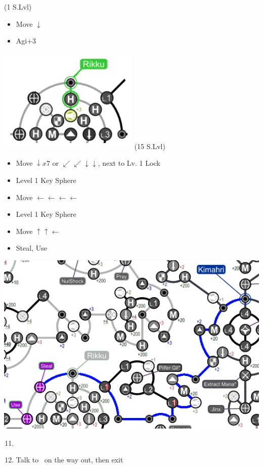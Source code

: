 \begin{spheregrid}
	\begin{multicols}{2}
		\begin{itemize}
			\rikkuf (1 S.Lvl)
			\begin{itemize}
				\item Move $\downarrow$
				\item Agi+3
			\end{itemize}
			\includegraphics[width=.5\columnwidth]{graphics/macalaniarikku}
			\kimahrif (15 S.Lvl)
			\begin{itemize}
				\item Move $\downarrow x7$ or $\swarrow\swarrow\downarrow\downarrow$, next to Lv. 1 Lock
				\item Level 1 Key Sphere
				\item Move $\leftarrow\leftarrow\leftarrow\leftarrow$
				\item Level 1 Key Sphere
				\item Move $\uparrow\uparrow\leftarrow$
				\item Steal, Use
			\end{itemize}
			\includegraphics[width=.8\columnwidth]{graphics/Kimahri_post_spheremorph}
		\end{itemize}
	\end{multicols}
\end{spheregrid}
\colstart
\begin{enumerate}
	\setcounter{enumi}{10}
	\item \formation{\tidus}{\lulu}{\kimahri}
	\item Talk to \auron\ on the way out, then exit
\end{enumerate}
\newpage